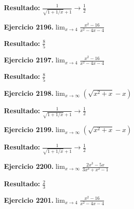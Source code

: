 \documentclass[10pt,a4paper]{article}
\begin{document}
\begin{solbox}
\textbf{Resultado:} \(\displaystyle \frac{1}{\sqrt{1+1/x}+1} \to \frac{1}{2}\)
\end{solbox}

\begin{ejbox}
\textbf{Ejercicio 2196.}\quad $\lim_{x\to 4} \frac{x^2-16}{x^2-4x-4}$
\end{ejbox}

\begin{solbox}
\textbf{Resultado:} \(\displaystyle \frac{8}{5}\)
\end{solbox}

\begin{ejbox}
\textbf{Ejercicio 2197.}\quad $\lim_{x\to 4} \frac{x^2-16}{x^2-4x-4}$
\end{ejbox}

\begin{solbox}
\textbf{Resultado:} \(\displaystyle \frac{8}{5}\)
\end{solbox}

\newpage
\begin{ejbox}
\textbf{Ejercicio 2198.}\quad $\lim_{x\to \infty} (\sqrt{x^2+x} - x)$
\end{ejbox}

\begin{solbox}
\textbf{Resultado:} \(\displaystyle \frac{1}{\sqrt{1+1/x}+1} \to \frac{1}{2}\)
\end{solbox}

\begin{ejbox}
\textbf{Ejercicio 2199.}\quad $\lim_{x\to \infty} (\sqrt{x^2+x} - x)$
\end{ejbox}

\begin{solbox}
\textbf{Resultado:} \(\displaystyle \frac{1}{\sqrt{1+1/x}+1} \to \frac{1}{2}\)
\end{solbox}

\begin{ejbox}
\textbf{Ejercicio 2200.}\quad $\lim_{x\to \infty} \frac{2x^3 - 5x}{3x^3 + x^2 - 1}$
\end{ejbox}

\begin{solbox}
\textbf{Resultado:} \(\displaystyle \frac{2}{3}\)
\end{solbox}

\newpage
\begin{ejbox}
\textbf{Ejercicio 2201.}\quad $\lim_{x\to 4} \frac{x^2-16}{x^2-4x-4}$
\end{ejbox}
\end{document}
